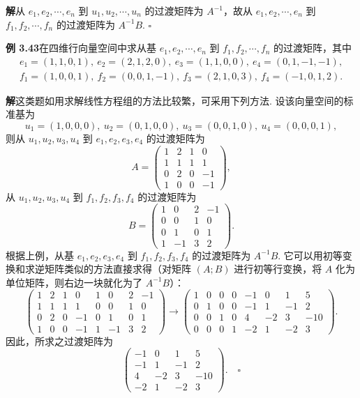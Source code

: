 \documentclass[UTF8, 12pt, fontset=fandol, oneside]{ctexart}
\begin{document}
\noindent\textbf{解}\quad 从 $e_1,e_2,\cdots,e_n$ 到 $u_1,u_2,\cdots,u_n$ 的过渡矩阵为 $A^{-1}$，故从 $e_1,e_2,\cdots,e_n$ 到 $f_1,f_2,\cdots,f_n$ 的过渡矩阵为 $A^{-1}B$. $\square$

\noindent\textbf{例 3.43}\quad 在四维行向量空间中求从基 $e_1,e_2,\cdots,e_n$ 到 $f_1,f_2,\cdots,f_n$ 的过渡矩阵，其中
\[
\begin{gathered}
e_1=(1,1,0,1),\ e_2=(2,1,2,0),\ e_3=(1,1,0,0),\ e_4=(0,1,-1,-1),\\
f_1=(1,0,0,1),\ f_2=(0,0,1,-1),\ f_3=(2,1,0,3),\ f_4=(-1,0,1,2).
\end{gathered}
\]

\noindent\textbf{解}\quad 这类题如用求解线性方程组的方法比较繁，可采用下列方法. 设该向量空间的标准基为
\[
u_1=(1,0,0,0),\ u_2=(0,1,0,0),\ u_3=(0,0,1,0),\ u_4=(0,0,0,1),
\]
则从 $u_1,u_2,u_3,u_4$ 到 $e_1,e_2,e_3,e_4$ 的过渡矩阵为
\[
A=\begin{pmatrix}
1 & 2 & 1 & 0\\
1 & 1 & 1 & 1\\
0 & 2 & 0 & -1\\
1 & 0 & 0 & -1
\end{pmatrix},
\]
从 $u_1,u_2,u_3,u_4$ 到 $f_1,f_2,f_3,f_4$ 的过渡矩阵为
\[
B=\begin{pmatrix}
1 & 0 & 2 & -1\\
0 & 0 & 1 & 0\\
0 & 1 & 0 & 1\\
1 & -1 & 3 & 2
\end{pmatrix}.
\]
根据上例，从基 $e_1,e_2,e_3,e_4$ 到 $f_1,f_2,f_3,f_4$ 的过渡矩阵为 $A^{-1}B$. 它可以用初等变换和求逆矩阵类似的方法直接求得（对矩阵 $(A;B)$ 进行初等行变换，将 $A$ 化为单位矩阵，则右边一块就化为了 $A^{-1}B$）：
\[
\left(\begin{array}{cccc|cccc}
1&2&1&0&1&0&2&-1\\
1&1&1&1&0&0&1&0\\
0&2&0&-1&0&1&0&1\\
1&0&0&-1&1&-1&3&2
\end{array}\right)
\to
\left(\begin{array}{cccc|cccc}
1&0&0&0&-1&0&1&5\\
0&1&0&0&-1&1&-1&2\\
0&0&1&0&4&-2&3&-10\\
0&0&0&1&-2&1&-2&3
\end{array}\right).
\]
因此，所求之过渡矩阵为
\[
\begin{pmatrix}
-1 & 0 & 1 & 5\\
-1 & 1 & -1 & 2\\
4 & -2 & 3 & -10\\
-2 & 1 & -2 & 3
\end{pmatrix}. \quad \square
\]
\end{document}
